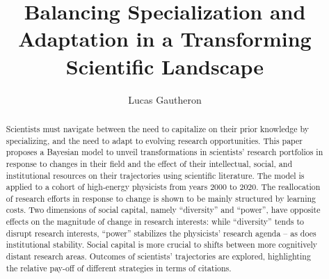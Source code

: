 \documentclass{article}
\title{Balancing Specialization and Adaptation in a Transforming Scientific Landscape}
\author{Lucas Gautheron}
\date{}
\begin{document}
\maketitle

\begin{abstract}
    Scientists must navigate between the need to capitalize on their prior knowledge by specializing, and the need to adapt to evolving research opportunities. This paper proposes a Bayesian model to unveil transformations in scientists' research portfolios in response to changes in their field and the effect of their intellectual, social, and institutional resources on their trajectories using scientific literature. The model is applied to a cohort of high-energy physicists from years 2000 to 2020. %
    The reallocation of research efforts in response to change is shown to be mainly structured by learning costs. Two dimensions of social capital, namely ``diversity'' and ``power'', have opposite effects on the magnitude of change in research interests: while ``diversity'' tends to disrupt research interests, ``power'' stabilizes the physicists' research agenda -- as does institutional stability. Social capital is more crucial to shifts between more cognitively distant research areas. Outcomes of scientists' trajectories are explored, highlighting the relative pay-off of different strategies in terms of citations.
\end{abstract}





\end{document}
